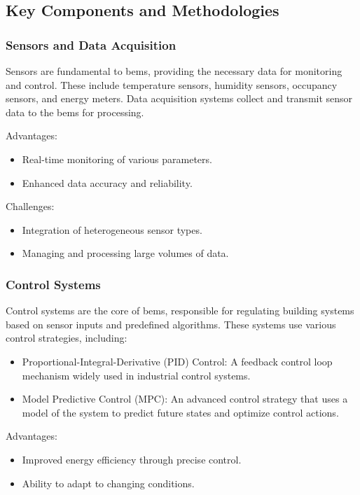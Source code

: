 \subsection*{Key Components and Methodologies}

\subsubsection*{Sensors and Data Acquisition}

Sensors are fundamental to \gls{bems}, providing the necessary data for monitoring and control. These include temperature sensors, humidity sensors, occupancy sensors, and energy meters. Data acquisition systems collect and transmit sensor data to the \gls{bems} for processing.

Advantages:
\begin{itemize}
    \item Real-time monitoring of various parameters.
    \item Enhanced data accuracy and reliability.
\end{itemize}

Challenges:
\begin{itemize}
    \item Integration of heterogeneous sensor types.
    \item Managing and processing large volumes of data.
\end{itemize}

\subsubsection*{Control Systems}

Control systems are the core of \gls{bems}, responsible for regulating building systems based on sensor inputs and predefined algorithms. These systems use various control strategies, including:

\begin{itemize}
    \item Proportional-Integral-Derivative (PID) Control: A feedback control loop mechanism widely used in industrial control systems.
    \item Model Predictive Control (MPC): An advanced control strategy that uses a model of the system to predict future states and optimize control actions.
\end{itemize}

Advantages:
\begin{itemize}
    \item Improved energy efficiency through precise control.
    \item Ability to adapt to changing conditions.
\end{itemize}

